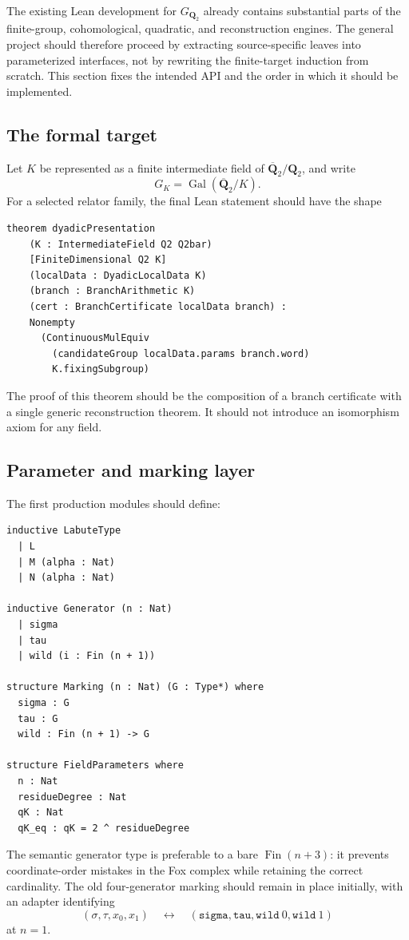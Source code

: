 \documentclass[11pt,reqno]{amsart}
\theoremstyle{definition}
\theoremstyle{remark}
\numberwithin{equation}{section}
\newcommand{\Q}{\mathbf Q}
\begin{document}
The existing Lean development for \(G_{\Q_2}\) already contains substantial
parts of the finite-group, cohomological, quadratic, and reconstruction
engines.  The general project should therefore proceed by extracting
source-specific leaves into parameterized interfaces, not by rewriting the
finite-target induction from scratch.  This section fixes the intended API
and the order in which it should be implemented.

\subsection{The formal target}

Let \(K\) be represented as a finite intermediate field of
\(\overline{\Q}_2/\Q_2\), and write
\[
 G_K=\operatorname{Gal}(\overline{\Q}_2/K).
\]
For a selected relator family, the final Lean statement should have the
shape
\begin{verbatim}
theorem dyadicPresentation
    (K : IntermediateField Q2 Q2bar)
    [FiniteDimensional Q2 K]
    (localData : DyadicLocalData K)
    (branch : BranchArithmetic K)
    (cert : BranchCertificate localData branch) :
    Nonempty
      (ContinuousMulEquiv
        (candidateGroup localData.params branch.word)
        K.fixingSubgroup)
\end{verbatim}
The proof of this theorem should be the composition of a branch certificate
with a single generic reconstruction theorem.  It should not introduce an
isomorphism axiom for any field.

\subsection{Parameter and marking layer}

The first production modules should define:
\begin{verbatim}
inductive LabuteType
  | L
  | M (alpha : Nat)
  | N (alpha : Nat)

inductive Generator (n : Nat)
  | sigma
  | tau
  | wild (i : Fin (n + 1))

structure Marking (n : Nat) (G : Type*) where
  sigma : G
  tau : G
  wild : Fin (n + 1) -> G

structure FieldParameters where
  n : Nat
  residueDegree : Nat
  qK : Nat
  qK_eq : qK = 2 ^ residueDegree
\end{verbatim}
The semantic generator type is preferable to a bare
\(\operatorname{Fin}(n+3)\): it prevents coordinate-order mistakes in the
Fox complex while retaining the correct cardinality.  The old
four-generator marking should remain in place initially, with an adapter
identifying
\[
 (\sigma,\tau,x_0,x_1)
 \quad\longleftrightarrow\quad
 (\mathtt{sigma},\mathtt{tau},\mathtt{wild}\ 0,
  \mathtt{wild}\ 1)
\]
at \(n=1\).
\end{document}
